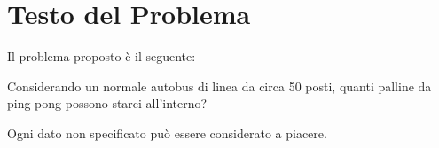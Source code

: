 
\section{Testo del Problema}

Il problema proposto è il seguente:

Considerando un normale autobus di linea da circa 50 posti, quanti palline da ping pong possono starci all'interno?

Ogni dato non specificato può essere considerato a piacere.